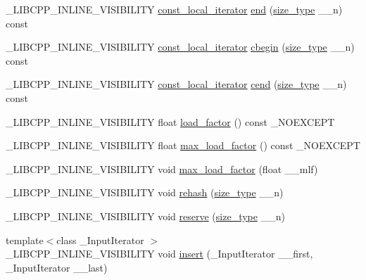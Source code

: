\begin{DoxyCompactItemize}
\item 
\+\_\+\+L\+I\+B\+C\+P\+P\+\_\+\+I\+N\+L\+I\+N\+E\+\_\+\+V\+I\+S\+I\+B\+I\+L\+I\+T\+Y \hyperlink{classunordered__multimap_a4813834c894681f449b5afe718336482}{const\+\_\+local\+\_\+iterator} \hyperlink{classunordered__multimap_ad920c688a25fbb926b170b14a25f6790}{end} (\hyperlink{classunordered__multimap_a977c4093df6d4d0302f280de19af4b58}{size\+\_\+type} \+\_\+\+\_\+n) const 
\item 
\+\_\+\+L\+I\+B\+C\+P\+P\+\_\+\+I\+N\+L\+I\+N\+E\+\_\+\+V\+I\+S\+I\+B\+I\+L\+I\+T\+Y \hyperlink{classunordered__multimap_a4813834c894681f449b5afe718336482}{const\+\_\+local\+\_\+iterator} \hyperlink{classunordered__multimap_a392690c861a688c143c2ff1fce54a524}{cbegin} (\hyperlink{classunordered__multimap_a977c4093df6d4d0302f280de19af4b58}{size\+\_\+type} \+\_\+\+\_\+n) const 
\item 
\+\_\+\+L\+I\+B\+C\+P\+P\+\_\+\+I\+N\+L\+I\+N\+E\+\_\+\+V\+I\+S\+I\+B\+I\+L\+I\+T\+Y \hyperlink{classunordered__multimap_a4813834c894681f449b5afe718336482}{const\+\_\+local\+\_\+iterator} \hyperlink{classunordered__multimap_a1a330d88f72a77d5343b4ba7ee35246f}{cend} (\hyperlink{classunordered__multimap_a977c4093df6d4d0302f280de19af4b58}{size\+\_\+type} \+\_\+\+\_\+n) const 
\item 
\+\_\+\+L\+I\+B\+C\+P\+P\+\_\+\+I\+N\+L\+I\+N\+E\+\_\+\+V\+I\+S\+I\+B\+I\+L\+I\+T\+Y float \hyperlink{classunordered__multimap_a3ad10271dc7f291a6103f7f3192bbd19}{load\+\_\+factor} () const \+\_\+\+N\+O\+E\+X\+C\+E\+P\+T
\item 
\+\_\+\+L\+I\+B\+C\+P\+P\+\_\+\+I\+N\+L\+I\+N\+E\+\_\+\+V\+I\+S\+I\+B\+I\+L\+I\+T\+Y float \hyperlink{classunordered__multimap_abd38d2a9d0312fa5171c85cae5ba4b87}{max\+\_\+load\+\_\+factor} () const \+\_\+\+N\+O\+E\+X\+C\+E\+P\+T
\item 
\+\_\+\+L\+I\+B\+C\+P\+P\+\_\+\+I\+N\+L\+I\+N\+E\+\_\+\+V\+I\+S\+I\+B\+I\+L\+I\+T\+Y void \hyperlink{classunordered__multimap_ac629ea15bd223a3d57ee8ac322cb31e0}{max\+\_\+load\+\_\+factor} (float \+\_\+\+\_\+mlf)
\item 
\+\_\+\+L\+I\+B\+C\+P\+P\+\_\+\+I\+N\+L\+I\+N\+E\+\_\+\+V\+I\+S\+I\+B\+I\+L\+I\+T\+Y void \hyperlink{classunordered__multimap_a7e20cf0a491b48f5f05ca3672e28bbfb}{rehash} (\hyperlink{classunordered__multimap_a977c4093df6d4d0302f280de19af4b58}{size\+\_\+type} \+\_\+\+\_\+n)
\item 
\+\_\+\+L\+I\+B\+C\+P\+P\+\_\+\+I\+N\+L\+I\+N\+E\+\_\+\+V\+I\+S\+I\+B\+I\+L\+I\+T\+Y void \hyperlink{classunordered__multimap_a3cb4e04963106a818ef702bb98bb8ef1}{reserve} (\hyperlink{classunordered__multimap_a977c4093df6d4d0302f280de19af4b58}{size\+\_\+type} \+\_\+\+\_\+n)
\item 
{\footnotesize template$<$class \+\_\+\+Input\+Iterator $>$ }\\\+\_\+\+L\+I\+B\+C\+P\+P\+\_\+\+I\+N\+L\+I\+N\+E\+\_\+\+V\+I\+S\+I\+B\+I\+L\+I\+T\+Y void \hyperlink{classunordered__multimap_a63ecbfd8b035d7225a64ad8261159924}{insert} (\+\_\+\+Input\+Iterator \+\_\+\+\_\+first, \+\_\+\+Input\+Iterator \+\_\+\+\_\+last)
\end{DoxyCompactItemize}

